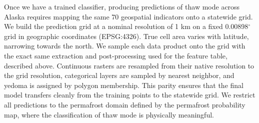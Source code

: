 \documentclass[../main.tex]{subfiles}
\begin{document}
Once we have a trained classifier, producing predictions of thaw mode across Alaska requires mapping the same 70 geospatial indicators onto a statewide grid. We build the prediction grid at a nominal resolution of 1 km on a fixed 0.00898$^\circ$ grid in geographic coordinates (EPSG:4326). True cell area varies with latitude, narrowing towards the north. We sample each data product onto the grid with the exact same extraction and post-processing used for the feature table, described above. Continuous rasters are resampled from their native resolution to the grid resolution, categorical layers are sampled by nearest neighbor, and yedoma is assigned by polygon membership. This parity ensures that the final model transfers cleanly from the training points to the statewide grid. We restrict all predictions to the permafrost domain defined by the  permafrost probability map, where the classification of thaw mode is physically meaningful.
\end{document}
